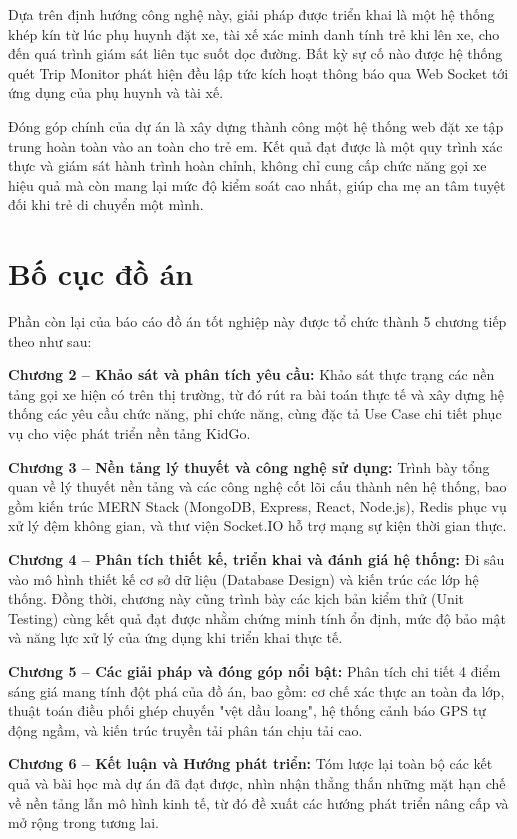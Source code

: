 \documentclass[../DoAn.tex]{subfiles}
\begin{document}
Dựa trên định hướng công nghệ này, giải pháp được triển khai là một hệ thống khép kín từ lúc phụ huynh đặt xe, tài xế xác minh danh tính trẻ khi lên xe, cho đến quá trình giám sát liên tục suốt dọc đường. Bất kỳ sự cố nào được hệ thống quét Trip Monitor phát hiện đều lập tức kích hoạt thông báo qua Web Socket tới ứng dụng của phụ huynh và tài xế.

Đóng góp chính của dự án là xây dựng thành công một hệ thống web đặt xe tập trung hoàn toàn vào an toàn cho trẻ em. Kết quả đạt được là một quy trình xác thực và giám sát hành trình hoàn chỉnh, không chỉ cung cấp chức năng gọi xe hiệu quả mà còn mang lại mức độ kiểm soát cao nhất, giúp cha mẹ an tâm tuyệt đối khi trẻ di chuyển một mình.

\section{Bố cục đồ án}
\label{section:1.4}
Phần còn lại của báo cáo đồ án tốt nghiệp này được tổ chức thành 5 chương tiếp theo như sau:

\textbf{Chương 2 – Khảo sát và phân tích yêu cầu:} Khảo sát thực trạng các nền tảng gọi xe hiện có trên thị trường, từ đó rút ra bài toán thực tế và xây dựng hệ thống các yêu cầu chức năng, phi chức năng, cùng đặc tả Use Case chi tiết phục vụ cho việc phát triển nền tảng KidGo.

\textbf{Chương 3 – Nền tảng lý thuyết và công nghệ sử dụng:} Trình bày tổng quan về lý thuyết nền tảng và các công nghệ cốt lõi cấu thành nên hệ thống, bao gồm kiến trúc MERN Stack (MongoDB, Express, React, Node.js), Redis phục vụ xử lý đệm không gian, và thư viện Socket.IO hỗ trợ mạng sự kiện thời gian thực.

\textbf{Chương 4 – Phân tích thiết kế, triển khai và đánh giá hệ thống:} Đi sâu vào mô hình thiết kế cơ sở dữ liệu (Database Design) và kiến trúc các lớp hệ thống. Đồng thời, chương này cũng trình bày các kịch bản kiểm thử (Unit Testing) cùng kết quả đạt được nhằm chứng minh tính ổn định, mức độ bảo mật và năng lực xử lý của ứng dụng khi triển khai thực tế.

\textbf{Chương 5 – Các giải pháp và đóng góp nổi bật:} Phân tích chi tiết 4 điểm sáng giá mang tính đột phá của đồ án, bao gồm: cơ chế xác thực an toàn đa lớp, thuật toán điều phối ghép chuyến "vệt dầu loang", hệ thống cảnh báo GPS tự động ngầm, và kiến trúc truyền tải phân tán chịu tải cao.

\textbf{Chương 6 – Kết luận và Hướng phát triển:} Tóm lược lại toàn bộ các kết quả và bài học mà dự án đã đạt được, nhìn nhận thẳng thắn những mặt hạn chế về nền tảng lẫn mô hình kinh tế, từ đó đề xuất các hướng phát triển nâng cấp và mở rộng trong tương lai.
\end{document}
